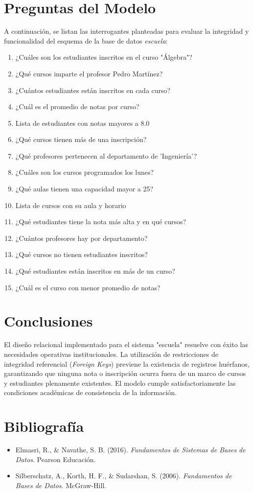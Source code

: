 \documentclass[10pt,letterpaper]{article}
\begin{document}
\section{Preguntas del Modelo}
A continuación, se listan las interrogantes planteadas para evaluar la integridad y funcionalidad del esquema de la base de datos \textit{escuela}:

\begin{enumerate}
    \item ¿Cuáles son los estudiantes inscritos en el curso "Álgebra"?
    \item ¿Qué cursos imparte el profesor Pedro Martínez?
    \item ¿Cuántos estudiantes están inscritos en cada curso?
    \item ¿Cuál es el promedio de notas por curso?
    \item Lista de estudiantes con notas mayores a 8.0
    \item ¿Qué cursos tienen más de una inscripción?
    \item ¿Qué profesores pertenecen al departamento de 'Ingeniería'?
    \item ¿Cuáles son los cursos programados los lunes?
    \item ¿Qué aulas tienen una capacidad mayor a 25?
    \item Lista de cursos con su aula y horario
    \item ¿Qué estudiantes tiene la nota más alta y en qué cursos?
    \item ¿Cuántos profesores hay por departamento?
    \item ¿Qué cursos no tienen estudiantes inscritos?
    \item ¿Qué estudiantes están inscritos en más de un curso?
    \item ¿Cuál es el curso con menor promedio de notas?
\end{enumerate}

\section{Conclusiones}
El diseño relacional implementado para el sistema "escuela" resuelve con éxito las necesidades operativas institucionales. La utilización de restricciones de integridad referencial (\textit{Foreign Keys}) previene la existencia de registros huérfanos, garantizando que ninguna nota o inscripción ocurra fuera de un marco de cursos y estudiantes plenamente existentes. El modelo cumple satisfactoriamente las condiciones académicas de consistencia de la información.

\section{Bibliografía}
\begin{itemize}
    \item Elmasri, R., \& Navathe, S. B. (2016). \textit{Fundamentos de Sistemas de Bases de Datos}. Pearson Educación.
    \item Silberschatz, A., Korth, H. F., \& Sudarshan, S. (2006). \textit{Fundamentos de Bases de Datos}. McGraw-Hill.
\end{itemize}
\end{document}
